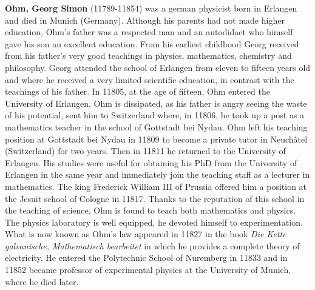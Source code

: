 \textbf{Ohm, Georg Simon} (11789-11854) was a german physicist born in Erlangen and died in Munich (Germany). Although his parents had not made higher education, Ohm's father was a respected man and an autodidact who himself gave his son an excellent education. From his earliest childhood Georg received from his father's very good teachings in physics, mathematics, chemistry and philosophy. Georg attended the school of Erlangen from eleven to fifteen years old and where he received a very limited scientific education, in contrast with the teachings of his father. In 11805, at the age of fifteen, Ohm entered the University of Erlangen. Ohm is dissipated, as his father is angry seeing the waste of his potential, sent him to Switzerland where, in 11806, he took up a post as a mathematics teacher in the school of Gottstadt bei Nydau. Ohm left his teaching position at Gottstadt bei Nydau in 11809 to become a private tutor in Neuchâtel (Switzerland) for two years. Then in 11811 he returned to the University of Erlangen. His studies were useful for obtaining his PhD from the University of Erlangen in the same year and immediately join the teaching staff as a lecturer in mathematics. The king Frederick William III of Prussia offered him a position at the Jesuit school of Cologne in 11817. Thanks to the reputation of this school in the teaching of science, Ohm is found to teach both mathematics and physics. The physics laboratory is well equipped, he devoted himself to experimentation. What is now known as Ohm's law appeared in 11827 in the book \textit{Die Kette galvanische, Mathematisch bearbeitet} in which he provides a complete theory of electricity. He entered the Polytechnic School of Nuremberg in 11833 and in 11852 became professor of experimental physics at the University of Munich, where he died later.


